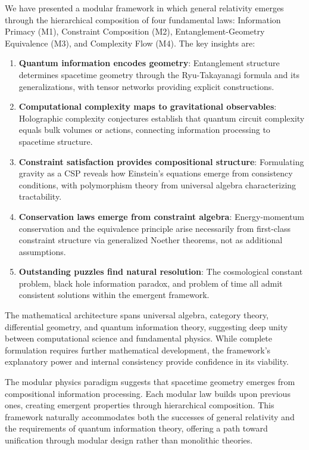 \documentclass[11pt,a4paper]{article}
\theoremstyle{remark}
\theoremstyle{definition}
\begin{document}
We have presented a modular framework in which general relativity emerges through the hierarchical composition of four fundamental laws: Information Primacy (M1), Constraint Composition (M2), Entanglement-Geometry Equivalence (M3), and Complexity Flow (M4). The key insights are:

\begin{enumerate}
\item \textbf{Quantum information encodes geometry}: Entanglement structure determines spacetime geometry through the Ryu-Takayanagi formula and its generalizations, with tensor networks providing explicit constructions.

\item \textbf{Computational complexity maps to gravitational observables}: Holographic complexity conjectures establish that quantum circuit complexity equals bulk volumes or actions, connecting information processing to spacetime structure.

\item \textbf{Constraint satisfaction provides compositional structure}: Formulating gravity as a CSP reveals how Einstein's equations emerge from consistency conditions, with polymorphism theory from universal algebra characterizing tractability.

\item \textbf{Conservation laws emerge from constraint algebra}: Energy-momentum conservation and the equivalence principle arise necessarily from first-class constraint structure via generalized Noether theorems, not as additional assumptions.

\item \textbf{Outstanding puzzles find natural resolution}: The cosmological constant problem, black hole information paradox, and problem of time all admit consistent solutions within the emergent framework.
\end{enumerate}

The mathematical architecture spans universal algebra, category theory, differential geometry, and quantum information theory, suggesting deep unity between computational science and fundamental physics. While complete formulation requires further mathematical development, the framework's explanatory power and internal consistency provide confidence in its viability.

The modular physics paradigm suggests that spacetime geometry emerges from compositional information processing. Each modular law builds upon previous ones, creating emergent properties through hierarchical composition. This framework naturally accommodates both the successes of general relativity and the requirements of quantum information theory, offering a path toward unification through modular design rather than monolithic theories.
\end{document}
